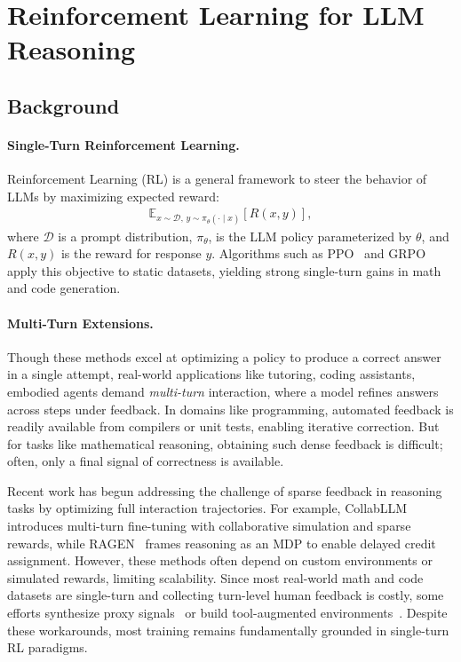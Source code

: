\section{Reinforcement Learning for LLM Reasoning}

\subsection{Background}
\paragraph{Single-Turn Reinforcement Learning.}
Reinforcement Learning (RL) is a general framework to steer the behavior of LLMs by maximizing expected reward:
\begin{align*}
\mathbb{E}_{x \sim \mathcal{D},\, y \sim \pi_\theta(\cdot \mid x)}[R(x,y)],
\end{align*}
where $\mathcal{D}$ is a prompt distribution, $\pi_\theta$, is the LLM policy parameterized by $\theta$, and $R(x,y)$ is the reward for response $y$. Algorithms such as PPO~\citep{ppo,instructgpt} and GRPO~\citep{deepseekr1,deepseekmath} apply this objective to static datasets, yielding strong single-turn gains in math and code generation. 

\paragraph{Multi-Turn Extensions.}
Though these methods excel at optimizing a policy to produce a correct answer in a single attempt, real-world applications like tutoring, coding assistants, embodied agents demand \emph{multi-turn} interaction, where a model refines answers across steps under feedback. In domains like programming, automated feedback is readily available from compilers or unit tests, enabling iterative correction. But for tasks like mathematical reasoning, obtaining such dense feedback is difficult; often, only a final signal of correctness is available.

Recent work has begun addressing the challenge of sparse feedback in reasoning tasks by optimizing full interaction trajectories.
For example, CollabLLM~\citep{collabllm2025} introduces multi-turn fine-tuning with collaborative simulation and sparse rewards, while RAGEN~\citep{ragen} frames reasoning as an MDP to enable delayed credit assignment. However, these methods often depend on custom environments or simulated rewards, limiting scalability. Since most real-world math and code datasets are single-turn and collecting turn-level human feedback is costly, some efforts synthesize proxy signals~\citep{swegym, osworld} or build tool-augmented environments~\citep{searchr1, retool, mint}. Despite these workarounds, most training remains fundamentally grounded in single-turn RL paradigms.

